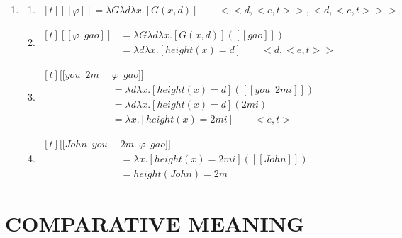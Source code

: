 \documentclass{ctexart}
\begin{document}
\begin{enumerate}
    \item \label{assignable_example_lambda}
    \begin{enumerate}
        \item \label{assignable_example_lambda_a}
        $\begin{aligned}[t]
            [\![\varphi]\!] = \lambda G \lambda d \lambda x.[G(x,d)] \qquad <<d,<e,t>>,<d,<e,t>>>
        \end{aligned}$

        \item \label{assignable_example_lambda_b}
        $\begin{aligned}[t]
            [\![\varphi \enspace gao]\!] 
            &= \lambda G \lambda d \lambda x.[G(x,d)]([\![gao]\!]) \\
            &= \lambda d \lambda x.[height(x) = d] \qquad <d,<e,t>>
        \end{aligned}$

        \item \label{assignable_example_lambda_c}
        $\begin{aligned}[t]
            [\![you \enspace 2m \enspace &\varphi \enspace gao]\!] \\
            &= \lambda d \lambda x.[height(x) = d]([\![you \enspace 2mi]\!]) \\
            &= \lambda d \lambda x.[height(x) = d](2mi) \\
            &= \lambda x.[height(x) = 2mi] \qquad <e,t>
        \end{aligned}$

        \item \label{assignable_example_lambda_d}
        $\begin{aligned}[t]
            [\![John \enspace you \enspace &2m \enspace \varphi \enspace gao]\!] \\
            &= \lambda x.[height(x) = 2mi]([\![John]\!]) \\
            &= height(John)=2m
        \end{aligned}$
        
    \end{enumerate}
\end{enumerate}

\section{COMPARATIVE MEANING}
\end{document}
